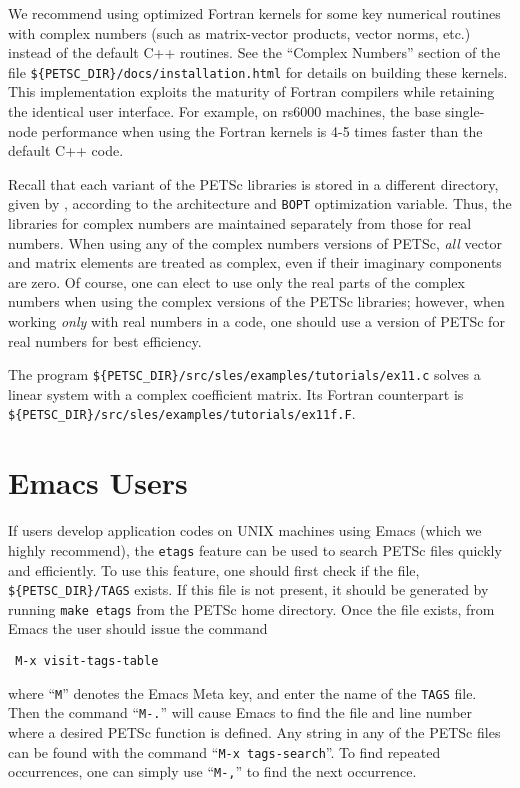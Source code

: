 {We recommend using optimized Fortran kernels for some key numerical
routines with complex numbers (such as matrix-vector products, vector
norms, etc.) instead of the default C++ routines.  See the ``Complex
Numbers'' section of the file {\tt \$\{PETSC\_DIR\}/docs/installation.html} for
details on building these kernels.  This implementation exploits the
maturity of Fortran compilers while retaining the identical user
interface.  For example, on rs6000 machines, the base single-node
performance when using the Fortran kernels is 4-5 times faster than
the default C++ code.

Recall that each variant of the PETSc libraries is stored in a
different directory, given by
, according to the
architecture and {\tt BOPT} optimization variable.  Thus, the libraries for complex
numbers are maintained separately from those for real
numbers.  When using any of the complex numbers versions of PETSc,
{\em all} vector and matrix elements are treated as complex,
even if their imaginary components are zero.
Of course, one can elect to use only the real parts of the complex
numbers when using the complex versions of the PETSc libraries;
however, when working {\em only} with real numbers in a code,
one should use a version of PETSc for real numbers for best efficiency.

The program {\tt \$\{PETSC\_DIR\}/src/sles/examples/tutorials/ex11.c}
solves a linear system with a complex
coefficient matrix.  Its Fortran counterpart is
{\tt \$\{PETSC\_DIR\}/src/sles/examples/tutorials/ex11f.F}.

\section{Emacs Users}  \label{sec:emacs}

 
If users develop application codes on UNIX machines using Emacs (which we
highly recommend), the {\tt etags} feature can be used to search PETSc 
files quickly and efficiently.  To use this feature, one should 
first check if the file,
{\tt \$\{PETSC\_DIR\}/TAGS} exists.  If this file is
not present, it should be generated by
running {\tt make etags} from the PETSc home directory. 
Once the file exists, from 
Emacs the user should issue
the command 
\begin{verbatim}
 M-x visit-tags-table
\end{verbatim}
 where ``{\tt M}''
denotes the Emacs Meta key, and enter the 
name of the {\tt TAGS} file. Then the command ``{\tt M-.}'' will cause Emacs 
to find the file and line number where a desired PETSc function 
is defined.  Any string in any of the PETSc files can be found with the 
command ``{\tt M-x tags-search}''. To find repeated occurrences, 
one can simply use ``{\tt M-,}'' to find the next occurrence.

}
